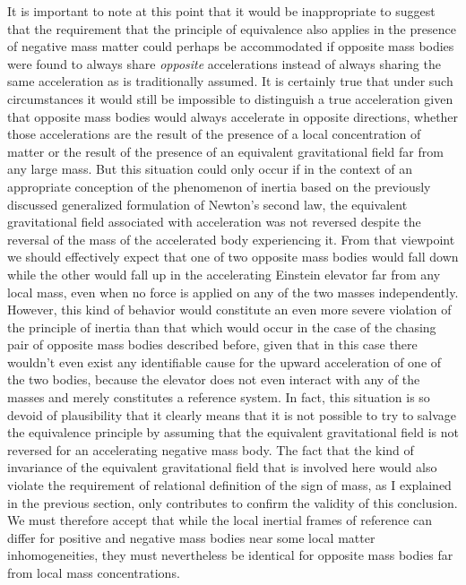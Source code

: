 \documentclass[notitlepage,12pt]{report}
\begin{document}
It is important to note at this point that it would be inappropriate to suggest that the requirement that the principle of equivalence also applies in the presence of negative mass matter could perhaps be accommodated if opposite mass bodies were found to always share \textit{opposite} accelerations instead of always sharing the same acceleration as is traditionally assumed. It is certainly true that under such circumstances it would still be impossible to distinguish a true acceleration given that opposite mass bodies would always accelerate in opposite directions, whether those accelerations are the result of the presence of a local concentration of matter or the result of the presence of an equivalent gravitational field far from any large mass. But this situation could only occur if in the context of an appropriate conception of the phenomenon of inertia based on the previously discussed generalized formulation of Newton's second law, the equivalent gravitational field associated with acceleration was not reversed despite the reversal of the mass of the accelerated body experiencing it. From that viewpoint we should effectively expect that one of two opposite mass bodies would fall down while the other would fall up in the accelerating Einstein elevator far from any local mass, even when no force is applied on any of the two masses independently. However, this kind of behavior would constitute an even more severe violation of the principle of inertia than that which would occur in the case of the chasing pair of opposite mass bodies described before, given that in this case there wouldn't even exist any identifiable cause for the upward acceleration of one of the two bodies, because the elevator does not even interact with any of the masses and merely constitutes a reference system. In fact, this situation is so devoid of plausibility that it clearly means that it is not possible to try to salvage the equivalence principle by assuming that the equivalent gravitational field is not reversed for an accelerating negative mass body. The fact that the kind of invariance of the equivalent gravitational field that is involved here would also violate the requirement of relational definition of the sign of mass, as I explained in the previous section, only contributes to confirm the validity of this conclusion. We must therefore accept that while the local inertial frames of reference can differ for positive and negative mass bodies near some local matter inhomogeneities, they must nevertheless be identical for opposite mass bodies far from local mass concentrations.
\end{document}
